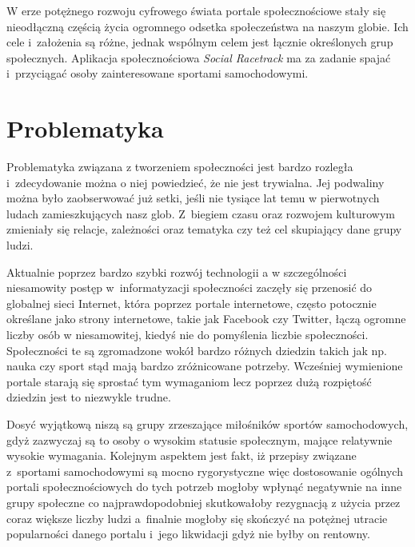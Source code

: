 \documentclass[../Kamil_Kowalewski_Main.tex]{subfiles}
\begin{document}
 {

    W erze potężnego rozwoju cyfrowego świata portale społecznościowe stały się
    nieodłączną częścią życia ogromnego odsetka społeczeństwa na naszym globie. Ich
    cele i~założenia są różne, jednak wspólnym celem jest łącznie określonych grup
    społecznych. Aplikacja społecznościowa \textit{Social Racetrack} ma za zadanie
    spajać i~przyciągać osoby zainteresowane sportami samochodowymi.

    \section{Problematyka}
    \label{chapter1:wprowadzenie_sporty:problematyka} {
        Problematyka związana z tworzeniem społeczności jest bardzo rozległa
        i~zdecydowanie można o niej powiedzieć, że nie jest trywialna. Jej podwaliny
        można było zaobserwować już setki, jeśli nie tysiące lat temu w pierwotnych ludach
        zamieszkujących nasz glob. Z~biegiem czasu oraz rozwojem kulturowym zmieniały
        się relacje, zależności oraz tematyka czy też cel skupiający dane grupy ludzi.

        Aktualnie poprzez bardzo szybki rozwój technologii a w szczególności
        niesamowity postęp w~informatyzacji społeczności zaczęły się przenosić do
        globalnej sieci Internet, która poprzez portale internetowe, często potocznie
        określane jako strony internetowe, takie jak Facebook\cite{website:facebook}
        czy Twitter\cite{website:twitter}, łączą ogromne liczby osób w niesamowitej,
        kiedyś nie do pomyślenia liczbie społeczności. Społeczności te są zgromadzone
        wokół bardzo różnych dziedzin takich jak np. nauka czy sport stąd mają bardzo
        zróżnicowane potrzeby. Wcześniej wymienione portale starają się sprostać tym
        wymaganiom lecz poprzez dużą rozpiętość dziedzin jest to niezwykle trudne.

        Dosyć wyjątkową niszą są grupy zrzeszające miłośników sportów samochodowych,
        gdyż zazwyczaj są to osoby o wysokim statusie społecznym, mające relatywnie
        wysokie wymagania. Kolejnym aspektem jest fakt, iż przepisy związane z~sportami
        samochodowymi są mocno rygorystyczne więc dostosowanie ogólnych portali
        społecznościowych do tych potrzeb mogłoby wpłynąć negatywnie na inne grupy
        społeczne co najprawdopodobniej skutkowałoby rezygnacją z użycia przez coraz
        większe liczby ludzi a~finalnie mogłoby się skończyć na potężnej utracie
        popularności danego portalu i~jego likwidacji gdyż nie byłby on rentowny.
    }

}
\end{document}
